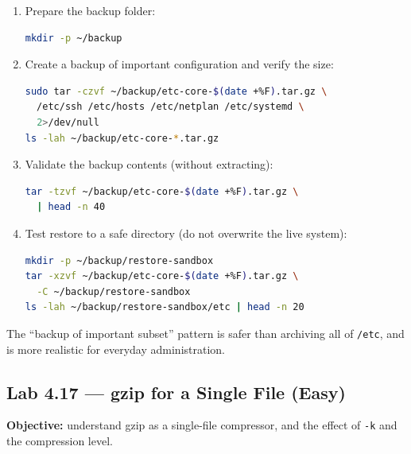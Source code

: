 \begin{enumerate}
    \item Prepare the backup folder:
\begin{lstlisting}[language=bash, caption={Creating the backup folder}]
mkdir -p ~/backup
\end{lstlisting}

    \item Create a backup of important configuration and verify the size:
\begin{lstlisting}[language=bash, caption={Backing up important configuration with tar.gz}]
sudo tar -czvf ~/backup/etc-core-$(date +%F).tar.gz \
  /etc/ssh /etc/hosts /etc/netplan /etc/systemd \
  2>/dev/null
ls -lah ~/backup/etc-core-*.tar.gz
\end{lstlisting}

    \item Validate the backup contents (without extracting):
\begin{lstlisting}[language=bash, caption={Validating backup contents}]
tar -tzvf ~/backup/etc-core-$(date +%F).tar.gz \
  | head -n 40
\end{lstlisting}

    \item Test restore to a safe directory (do not overwrite the live system):
\begin{lstlisting}[language=bash, caption={Test restore to a sandbox folder}]
mkdir -p ~/backup/restore-sandbox
tar -xzvf ~/backup/etc-core-$(date +%F).tar.gz \
  -C ~/backup/restore-sandbox
ls -lah ~/backup/restore-sandbox/etc | head -n 20
\end{lstlisting}
\end{enumerate}

\begin{tipbox}
The ``backup of important subset'' pattern is safer than archiving all of
\texttt{/etc}, and is more realistic for everyday administration.
\end{tipbox}

\subsection*{Lab 4.17 --- gzip for a Single File (Easy)}
\textbf{Objective:} understand gzip as a single-file compressor, and the effect
of \texttt{-k} and the compression level.

